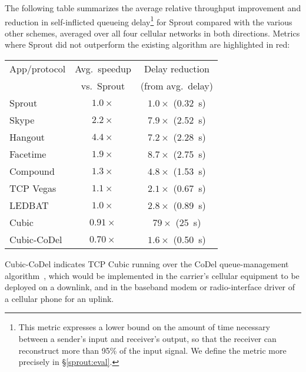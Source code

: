The following table summarizes the average relative throughput
improvement and reduction in self-inflicted queueing
delay\footnote{This metric expresses a lower bound on the amount of
  time necessary between a sender's input and receiver's output, so
  that the receiver can reconstruct more than 95\% of the input
  signal. We define the metric more precisely in \S\ref{sprout:eval}.} for
Sprout compared with the various other schemes, averaged over all four
cellular networks in both directions. Metrics where Sprout did not
outperform the existing algorithm are highlighted in red:

\vspace{\baselineskip}

\noindent \begin{tabular}{|l|c|c|}
\hline
App/protocol & Avg.~speedup & Delay reduction \\
& \footnotesize{vs.~Sprout} & \footnotesize{(from avg.~delay)}\\
\hline
\hline
\cellcolor{blue!20}Sprout & \cellcolor{blue!20}$1.0\times$ & \cellcolor{blue!20}$1.0\times$ (0.32~s) \\
\hline
Skype & $2.2\times$ & $7.9\times$ (2.52~s) \\
Hangout & $4.4\times$ & $7.2\times$ (2.28~s) \\
Facetime & $1.9\times$ & $8.7\times$ (2.75~s) \\
\hline
Compound & $1.3\times$ & $4.8\times$ (1.53~s) \\
TCP Vegas & $1.1\times$ & $2.1\times$ (0.67~s) \\
LEDBAT & $1.0\times$ & $2.8\times$ (0.89~s) \\
Cubic & \cellcolor{red!20}$0.91\times$ & $79\times$ (25~s)\\
\hline
Cubic-CoDel & \cellcolor{red!20}$0.70\times$ & $1.6\times$ (0.50~s) \\
\hline
\end{tabular}

\vspace{\baselineskip}

Cubic-CoDel indicates TCP Cubic running over the CoDel
queue-management algorithm~\cite{CoDel}, which would be implemented in the
carrier's cellular equipment to be deployed on a downlink, and in
the baseband modem or radio-interface driver of a cellular phone for an
uplink.

